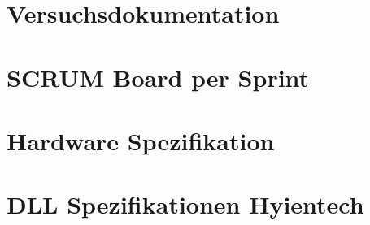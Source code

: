 \chapter{Versuchsdokumentation}
\label{app:ch:versuche}

\chapter{SCRUM Board per Sprint}
\newpage
\chapter{Hardware Spezifikation}
\label{app:ch:hardwarespez}
\chapter{DLL Spezifikationen Hyientech}
\label{app:ch:dllspezifikation}
